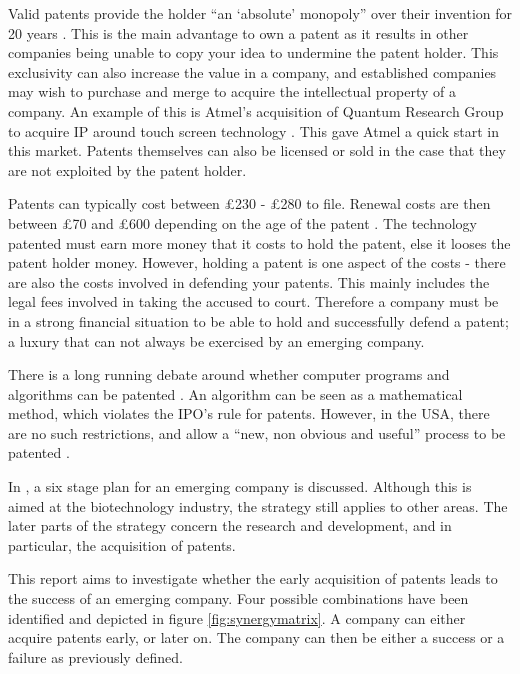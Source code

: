 
Valid patents provide the holder ``an `absolute' monopoly'' over their invention for 20 years \cite{waelde2013contemporary}.
This is the main advantage to own a patent as it results in other companies being unable to copy your idea to undermine the patent holder.
This exclusivity can also increase the value in a company, and established companies may wish to purchase and merge to acquire the intellectual property of a company.
An example of this is Atmel's acquisition of Quantum Research Group to acquire IP around touch screen technology \cite{atmel:acq:qrg08}.
This gave Atmel a quick start in this market.%
Patents themselves can also be licensed or sold in the case that they are not exploited by the patent holder. 

Patents can typically cost between \pounds 230 - \pounds 280 to file. 
Renewal costs are then between \pounds 70 and \pounds 600 depending on the age of the patent \cite{ipocosts}.
The technology patented must earn more money that it costs to hold the patent, else it looses the patent holder money.
However, holding a patent is one aspect of the costs - there are also the costs involved in defending your patents.
This mainly includes the legal fees involved in taking the accused to court. 
Therefore a company must be in a strong financial situation to be able to hold and successfully defend a patent; a luxury that can not always be exercised by an emerging company.


There is a long running debate around whether computer programs and algorithms can be patented \cite{juden2005can, klemens2005math}.
An algorithm can be seen as a mathematical method, which violates the IPO's rule for patents.
However, in the USA, there are no such restrictions, and allow a ``new, non obvious and useful'' process to be patented \cite{usapatent}.

In \cite{zahra1996technology}, a six stage plan for an emerging company is discussed. 
Although this is aimed at the biotechnology industry, the strategy still applies to other areas. 
The later parts of the strategy concern the research and development, and in particular, the acquisition of patents. 


This report aims to investigate whether the early acquisition of patents leads to the success of an emerging company.
Four possible combinations have been identified and depicted in figure \ref{fig:synergymatrix}. 
A company can either acquire patents early, or later on. 
The company can then be either a success or a failure as previously defined.

